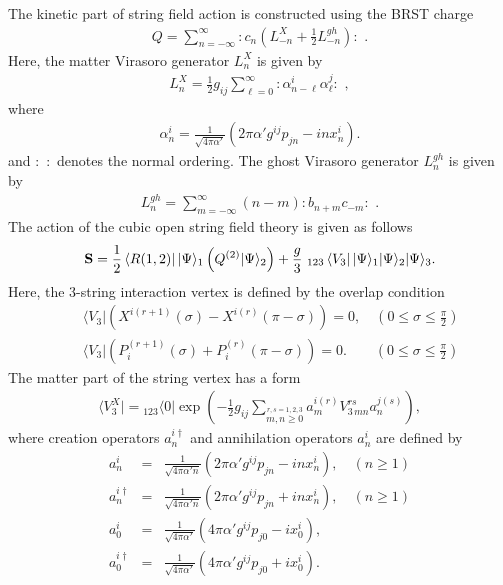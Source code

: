 \documentclass[a4paper,12pt]{article}
\newcommand{\nn}{\nonumber\\}
\def\bra{\langle}
\begin{document}
The kinetic part of string field action is 
constructed using the BRST charge
\begin{eqnarray}
 \label{Q}
Q = \sum_{n=-\infty}^{\infty}
: c_n \left(L_{-n}^X + \frac{1}{2} L_{-n}^{gh}\right) : \,\, .
\end{eqnarray}
Here, the matter Virasoro generator $L_n^X$
is given by
\begin{eqnarray}
 \label{LX}
L_n^X = 
\frac{1}{2} g_{ij} \sum_{\ell=0}^\infty 
:\alpha_{n-\ell}^i \alpha_\ell^j : \,\, ,
\end{eqnarray}
where
\begin{eqnarray}
 \label{alphas}
\alpha_n^i = 
\frac{1}{\sqrt{4\pi\alpha'}}
(2\pi\alpha' g^{ij} p_{jn} - i n x_n^i) .
\end{eqnarray}
and $:\, \,:$ denotes the normal ordering.
The ghost Virasoro generator
$L_n^{gh}$
is given by
\begin{eqnarray}
 \label{Lgh}
L^{gh}_n
=
\sum_{m=-\infty}^{\infty}
(n-m): b_{n+m} c_{-m}: \,\,.
\end{eqnarray}
%
The action of the cubic
open string field theory is given
as follows \cite{NCSFT,GJ,Samuel,Cremmer,NOhta}
\begin{eqnarray}
 \label{cubic}
{\bf S} = 
\frac{1}{2} 
\left\langle R(1,2)\right| 
| \Psi \rangle_1
\left(
Q^{(2)} | \Psi \rangle_2
\right)
+\frac{g}{3}\, \,  {}_{123}\left\langle V_3\right|  
| \Psi \rangle_1
| \Psi \rangle_2
| \Psi \rangle_3  .
\end{eqnarray}
Here,
the 3-string interaction vertex is defined by 
the overlap condition
\begin{eqnarray}
 \label{overlap}
&& \bra V_3 |
\left( X^{i(r+1)}(\sigma) - X^{i (r)}(\pi-\sigma) \right) = 0, 
\quad (0 \le \sigma \le \frac{\pi}{2} )   \nn
&& \bra V_3 |
\left(P_i^{(r+1)}(\sigma) + P^{(r)}_i(\pi-\sigma)\right) = 0.
\qquad (0 \le \sigma \le \frac{\pi}{2} )
\end{eqnarray}
The matter part of the string vertex has a form
\begin{eqnarray}
 \label{V3}
\bra V_3^X |
=
{}_{123} \bra 0 | 
\exp
\left(-\frac{1}{2}
g_{ij}\sum_{\stackrel{r,s=1,2,3}{m,n\geq 0}} 
a^{i(r)}_m V_{3\,mn}^{rs} a_n^{j(s)} \right),
\end{eqnarray}
where creation operators $a_n^{i \dagger}$
and annihilation operators
$a_n^i$  are defined by
\begin{eqnarray}
 \label{cre}
a_n^i &=& \frac{1}{\sqrt{4\pi\alpha'n}}
(2\pi\alpha' g^{ij}p_{jn} - i n x_n^i), 
\quad (n \ge 1)  \nn
a_n^{i \dagger} &=& \frac{1}{\sqrt{4\pi\alpha'n}}
(2\pi\alpha' g^{ij}p_{jn} + i n x_n^i),
\quad (n \ge 1) \nn
a_0^i &=& 
\frac{1}{\sqrt{4\pi\alpha'}}
(4\pi\alpha' g^{ij}p_{j0} - i x_0^i), \nn
a_0^{i \dagger} &=& 
\frac{1}{\sqrt{4\pi \alpha'}}
(4\pi\alpha' g^{ij} p_{j0} + i x_0^i).
\end{eqnarray}
\end{document}
